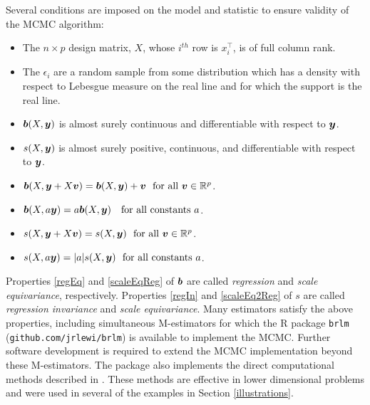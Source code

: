 \documentclass[12pt]{article}
\makeatletter
\newcommand{\by}{\mbox{\boldmath $y$}}
\newcommand{\bv}{\mbox{\boldmath $v$}}
\newcommand{\bb}{\mbox{\boldmath $b$}}
\newcommand{\green}[1]{{\color{green}#1}}
\newcommand{\labitem}[2]{%
\def\@itemlabel{\textbf{#1}{.}}
\item
\def\@currentlabel{#1}\label{#2}}
\makeatother
\begin{document}



Several conditions are imposed on the model and statistic to ensure validity of the MCMC algorithm:
\begin{itemize}
\labitem{C1}{fullRank} The $n \times p$ design matrix, $X$, whose $i^{th}$ row is $x_i^\top$, 
is of full column rank.  
\labitem{C2}{supReal} The $\epsilon_i$ are a random sample from some distribution which has a density with 
respect to Lebesgue measure on the real line and for which the support is the real line.  
\labitem{C3}{asb}$\bb(X,\by)$ is almost surely continuous and differentiable with respect to $\by$.  
\labitem{C4}{as} $s(X,\by)$ is almost surely positive, continuous, and differentiable with respect to $\by$.  
\labitem{C5}{regEq} $\bb(X,\by+X\bv)=\bb(X,\by)+\bv \ \ \text{for  all}\ \bv\in\mathbb{R}^p$. 
\labitem{C6}{scaleEqReg} $\bb(X,a\by)=a\bb(X,\by)\ \ \ \text{for all constants } a$.  
\labitem{C7}{regIn} $s(X,\by+X\bv)=s(X,\by) \ \ \text{for all}\ \bv\in\mathbb{R}^p$.  
\labitem{C8}{scaleEq2Reg} $s(X, a\by)=|a|s(X,\by) \ \ \text{for all constants } a$.  
\end{itemize}
Properties \ref{regEq} and \ref{scaleEqReg} of $\bb$ are called
\textit{regression} and \textit{scale equivariance},
respectively.  Properties \ref{regIn} and \ref{scaleEq2Reg} of $s$ are called \textit{regression invariance}
and \textit{scale equivariance}. 
Many estimators satisfy the above properties, including simultaneous M-estimators \citep{huber2009, maronna2006} for which the R package \texttt{brlm} (\texttt{github.com/jrlewi/brlm}) is available to implement the MCMC. Further software development is required to extend the MCMC implementation beyond these M-estimators. The package also implements the direct computational methods described in \cite{lewis2014}. These methods are effective in lower dimensional problems and were used in several of the examples in Section \ref{illustrations}.
\end{document}
